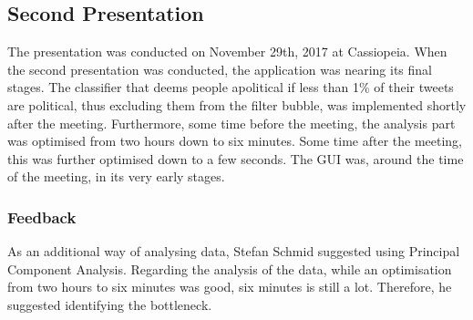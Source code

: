 \subsection{Second Presentation}\label{subsec:Exp2}
The presentation was conducted on November 29th, 2017 at Cassiopeia.
When the second presentation was conducted, the application was nearing its
final stages. The classifier that deems people apolitical if less than 1\% of
their tweets are political, thus excluding them from the filter bubble, was
implemented shortly after the meeting. Furthermore, some time before the
meeting, the analysis part was optimised from two hours down to six minutes.
Some time after the meeting, this was further optimised down to a few seconds.
The GUI was, around the time of the meeting, in its very early stages.

\subsubsection{Feedback}
As an additional way of analysing data, Stefan Schmid suggested using Principal
Component Analysis. Regarding the analysis of the data, while an optimisation
from two hours to six minutes was good, six minutes is still a lot. Therefore,
he suggested identifying the bottleneck. 

